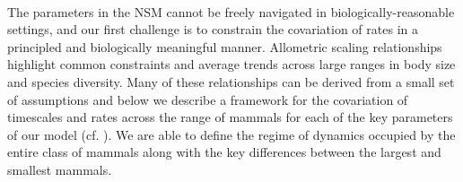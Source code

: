 \documentclass{pnastwo}
\begin{document}
\begin{article}
%



\vspace{2mm}
 \\ 
The parameters in the NSM cannot be freely navigated in biologically-reasonable settings, and our first challenge is to constrain the covariation of rates in a principled and biologically meaningful manner. %
Allometric scaling relationships highlight common constraints and average trends across large ranges in body size and species diversity. Many of these relationships can be derived from a small set of assumptions and below we describe a framework for the covariation of timescales and rates across the range of mammals for each of the key parameters of our model (cf. \cite{Yodzis:1992hg}). We are able to define the regime of dynamics occupied by the entire class of mammals along with the key differences between the largest and smallest mammals.




\end{article}
\end{document}
